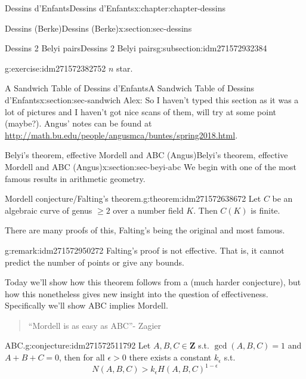 \documentclass[oneside,10pt,]{book}
\numberwithin{equation}{section}
\newcommand{\ZZ}{\mathbf{Z}}
\newcommand{\gt}{>}
\begin{document}
\begin{chapterptx}{Dessins d'Enfants}{}{Dessins d'Enfants}{}{}{x:chapter:chapter-dessins}
\begin{sectionptx}{Dessins (Berke)}{}{Dessins (Berke)}{}{}{x:section:sec-dessins}
\begin{subsectionptx}{Dessins 2 Belyi pairs}{}{Dessins 2 Belyi pairs}{}{}{g:subsection:idm271572932384}
\begin{inlineexercise}{}{g:exercise:idm271572382752}
\(n\) star.%
\end{inlineexercise}
\end{subsectionptx}
\end{sectionptx}
%
%
\typeout{************************************************}
\typeout{************************************************}
%
\begin{sectionptx}{A Sandwich Table of Dessins d'Enfants}{}{A Sandwich Table of Dessins d'Enfants}{}{}{x:section:sec-sandwich}
Alex: So I haven't typed this section as it was a lot of pictures and I haven't got nice scans of them, will try at some point (maybe?). Angus' notes can be found at \url{http://math.bu.edu/people/angusmca/buntes/spring2018.html}.%
\end{sectionptx}
%
%
\typeout{************************************************}
\typeout{************************************************}
%
\begin{sectionptx}{Belyi's theorem, effective Mordell and ABC (Angus)}{}{Belyi's theorem, effective Mordell and ABC (Angus)}{}{}{x:section:sec-beyi-abc}
We begin with one of the most famous results in arithmetic geometry.%
\begin{theorem}{Mordell conjecture\slash{}Falting's theorem.}{}{g:theorem:idm271572638672}%
Let \(C\) be an algebraic curve of genus \(\ge 2\) over a number field \(K\). Then \(C(K)\) is finite.%
\end{theorem}
There are many proofs of this, Falting's being the original and most famous.%
\begin{remark}{}{g:remark:idm271572950272}%
Falting's proof is not effective. That is, it cannot predict the number of points or give any bounds.%
\end{remark}
Today we'll show how this theorem follows from a (much harder conjecture), but how this nonetheless gives new insight into the question of effectiveness. Specifically we'll show ABC implies Mordell.%
\begin{quote}%
``Mordell is as easy as ABC''- Zagier%
\end{quote}
\begin{conjecture}{ABC.}{}{g:conjecture:idm271572511792}%
Let \(A,B,C\in \ZZ\) s.t. \(\gcd(A,B,C)  =1 \) and \(A+B+C=0\), then for all \(\epsilon \gt 0\) there exists a constant \(k_\epsilon\) s.t.%
\begin{equation*}
N(A,B,C) \gt k_\epsilon H(A,B,C)^{1-\epsilon}
\end{equation*}

\end{conjecture}
\end{sectionptx}
\end{chapterptx}
\end{document}
